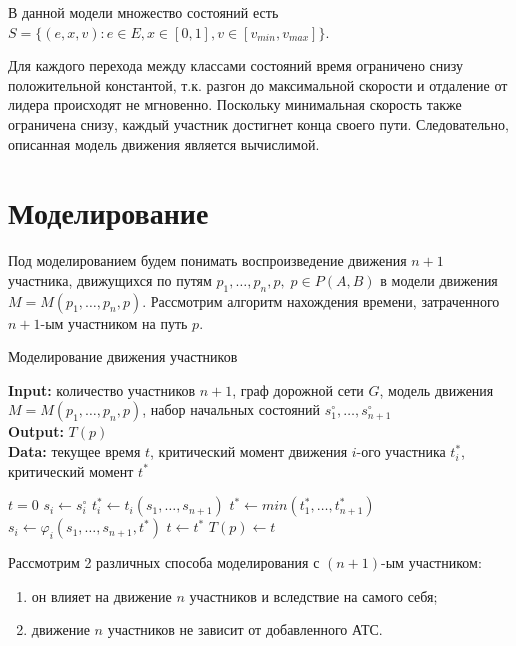 \documentclass[12pt, a4paper]{article}
\begin{document}
	В данной модели множество состояний есть $S = \{(e, x, v): e \in E, x \in [0, 1], v \in [v_{min}, v_{max}]\}$.
	
	Для каждого перехода между классами состояний время ограничено снизу положительной константой, т.к. разгон до максимальной скорости и отдаление от лидера происходят не мгновенно. Поскольку минимальная скорость также ограничена снизу, каждый участник достигнет конца своего пути. Следовательно, описанная модель движения является вычислимой.
	
	\newpage
	\section{Моделирование}
	
	Под моделированием будем понимать воспроизведение движения $n+1$ участника, движущихся по путям $p_1, \dots, p_n, p, \; p \in P(A, B)$ в модели движения $M = M(p_1, \dots, p_n, p)$.
	Рассмотрим алгоритм нахождения времени, затраченного $n+1$-ым участником на путь $p$.
	
	\begin{algorithm}[H]
		\caption{Моделирование движения участников}
		\label{alg:modeling}
		{\bf {Input:}} количество участников $n+1$, граф дорожной сети $G$, модель движения $M = M(p_1, \dots, p_n, p)$, набор начальных состояний $s^{\circ}_1, \dots, s^{\circ}_{n+1}$\\
		{\bf {Output:}} $T(p)$\\
		{\bf {Data:}} текущее время $t$, критический момент движения $i$-ого участника $t^*_i$, критический момент $t^*$
		\begin{algorithmic}[1]
			\State $t = 0$
			\State $s_i \gets s^{\circ}_i$
			\EndFor
			\State $t^*_i \gets t_i(s_1, \dots, s_{n+1})$ 
			\EndFor
			\State $t^* \gets min \left(t^*_1, \dots, t^*_{n+1} \right)$
			\State $s_i \gets \varphi_i(s_1, \dots, s_{n+1}, t^*)$
			\EndFor
			\State $t \gets t^*$
			\EndWhile
			\State $T(p) \gets t$
		\end{algorithmic}
	\end{algorithm}
	
	
	Рассмотрим 2 различных способа моделирования с $(n+1)$-ым участником: 
	\begin{enumerate}
		\item он влияет на движение $n$ участников и вследствие на самого себя;
		\item движение $n$ участников не зависит от добавленного АТС.
	\end{enumerate}
	
\end{document}
